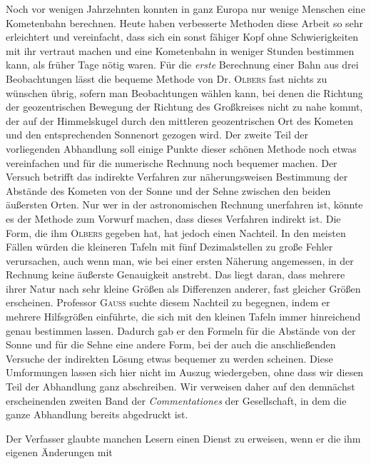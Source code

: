 %
Noch vor wenigen Jahrzehnten konnten in ganz Europa nur wenige Menschen eine Kometenbahn berechnen. Heute haben verbesserte Methoden diese Arbeit so sehr erleichtert und vereinfacht, dass sich ein sonst fähiger Kopf ohne Schwierigkeiten mit ihr vertraut machen und eine Kometenbahn in weniger Stunden bestimmen kann, als früher Tage nötig waren. Für die \textit{erste} Berechnung einer Bahn aus drei Beobachtungen lässt die bequeme Methode von Dr. \textsc{Olbers} fast nichts zu wünschen übrig, sofern man Beobachtungen wählen kann, bei denen die Richtung der geozentrischen Bewegung der Richtung des Großkreises nicht zu nahe kommt, der auf der Himmelskugel durch den mittleren geozentrischen Ort des Kometen und den entsprechenden Sonnenort gezogen wird. Der zweite Teil der vorliegenden Abhandlung soll einige Punkte dieser schönen Methode noch etwas vereinfachen und für die numerische Rechnung noch bequemer machen. Der Versuch betrifft das indirekte Verfahren zur näherungsweisen Bestimmung der Abstände des Kometen von der Sonne und der Sehne zwischen den beiden äußersten Orten. Nur wer in der astronomischen Rechnung unerfahren ist, könnte es der Methode zum Vorwurf machen, dass dieses Verfahren indirekt ist. Die Form, die ihm \textsc{Olbers} gegeben hat, hat jedoch einen Nachteil. In den meisten Fällen würden die kleineren Tafeln mit fünf Dezimalstellen zu große Fehler verursachen, auch wenn man, wie bei einer ersten Näherung angemessen, in der Rechnung keine äußerste Genauigkeit anstrebt. Das liegt daran, dass mehrere ihrer Natur nach sehr kleine Größen als Differenzen anderer, fast gleicher Größen erscheinen. Professor \textsc{Gauß} suchte diesem Nachteil zu begegnen, indem er mehrere Hilfsgrößen einführte, die sich mit den kleinen Tafeln immer hinreichend genau bestimmen lassen. Dadurch gab er den Formeln für die Abstände von der Sonne und für die Sehne eine andere Form, bei der auch die anschließenden Versuche der indirekten Lösung etwas bequemer zu werden scheinen. Diese Umformungen lassen sich hier nicht im Auszug wiedergeben, ohne dass wir diesen Teil der Abhandlung ganz abschreiben. Wir verweisen daher auf den demnächst erscheinenden zweiten Band der \textit{Commentationes} der Gesellschaft, in dem die ganze Abhandlung bereits abgedruckt ist.

Der Verfasser glaubte manchen Lesern einen Dienst zu erweisen, wenn er die ihm eigenen Änderungen mit
